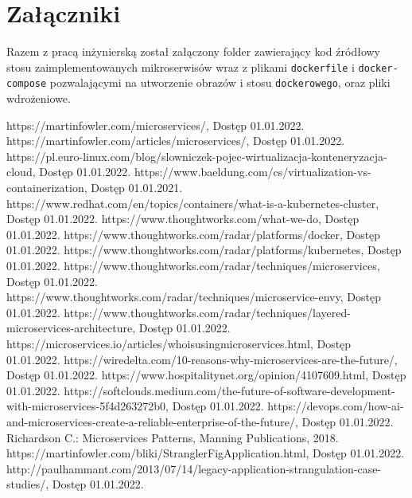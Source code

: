 \documentclass[12pt,twoside]{article}
\begin{document}
\clearpage
\section*{Załączniki}

Razem z pracą inżynierską został załączony folder zawierający kod źródłowy stosu zaimplementowanych mikroserwisów wraz z plikami \texttt{dockerfile} i \texttt{docker-compose} pozwalającymi na utworzenie obrazów i stosu \texttt{dockerowego}, oraz pliki wdrożeniowe.
\clearpage


\begin{thebibliography}{4}
https://martinfowler.com/microservices/, Dostęp 01.01.2022.
https://martinfowler.com/articles/microservices/, Dostęp 01.01.2022.
https://pl.euro-linux.com/blog/slowniczek-pojec-wirtualizacja-konteneryzacja-cloud, Dostęp 01.01.2022.
https://www.baeldung.com/cs/virtualization-vs-containerization, Dostęp 01.01.2021.
https://www.redhat.com/en/topics/containers/what-is-a-kubernetes-cluster, Dostęp 01.01.2022.
https://www.thoughtworks.com/what-we-do, Dostęp 01.01.2022.
https://www.thoughtworks.com/radar/platforms/docker, Dostęp 01.01.2022.
https://www.thoughtworks.com/radar/platforms/kubernetes, Dostęp 01.01.2022.
https://www.thoughtworks.com/radar/techniques/microservices, Dostęp 01.01.2022.
https://www.thoughtworks.com/radar/techniques/microservice-envy, Dostęp 01.01.2022.
https://www.thoughtworks.com/radar/techniques/layered-microservices-architecture, Dostęp 01.01.2022.
https://microservices.io/articles/whoisusingmicroservices.html, Dostęp 01.01.2022.
https://wiredelta.com/10-reasons-why-microservices-are-the-future/, Dostęp 01.01.2022.
https://www.hospitalitynet.org/opinion/4107609.html, Dostęp 01.01.2022.
https://softclouds.medium.com/the-future-of-software-development-with-microservices-5f4d263272b0, Dostęp 01.01.2022.
https://devops.com/how-ai-and-microservices-create-a-reliable-enterprise-of-the-future/, Dostęp 01.01.2022.
 Richardson C.: Microservices Patterns, Manning Publications, 2018.
https://martinfowler.com/bliki/StranglerFigApplication.html, Dostęp 01.01.2022.
http://paulhammant.com/2013/07/14/legacy-application-strangulation-case-studies/, Dostęp 01.01.2022.

\end{thebibliography}
\end{document}
